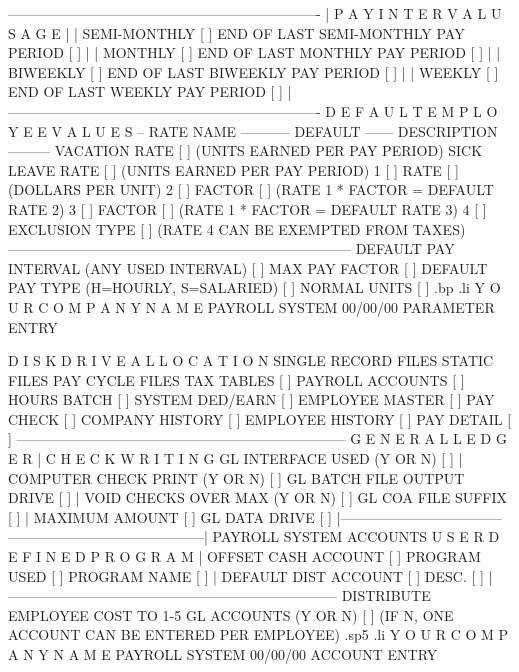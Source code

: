      -------------------------------------------------------------------
     |		     P A Y   I N T E R V A L   U S A G E	       |
     | SEMI-MONTHLY [ ] END OF LAST SEMI-MONTHLY PAY PERIOD [	     ] |
     | MONTHLY	    [ ] END OF LAST MONTHLY PAY PERIOD	    [	     ] |
     | BIWEEKLY     [ ] END OF LAST BIWEEKLY PAY PERIOD     [	     ] |
     | WEEKLY	    [ ] END OF LAST WEEKLY PAY PERIOD	    [	     ] |
     -------------------------------------------------------------------
	      D E F A U L T   E M P L O Y E E	V A L U E S
   -- RATE NAME  -----------  DEFAULT  ------  DESCRIPTION  ---------
    VACATION	     RATE   [	      ] (UNITS EARNED PER PAY PERIOD)
    SICK LEAVE	     RATE   [	      ] (UNITS EARNED PER PAY PERIOD)
 1 [		   ] RATE   [	      ] (DOLLARS PER UNIT)
 2 [		   ] FACTOR [	      ] (RATE 1 * FACTOR = DEFAULT RATE 2)
 3 [		   ] FACTOR [	      ] (RATE 1 * FACTOR = DEFAULT RATE 3)
 4 [		   ] EXCLUSION TYPE [ ] (RATE 4 CAN BE EXEMPTED FROM TAXES)
 --------------------------------------------------------------------------
  DEFAULT PAY INTERVAL (ANY USED INTERVAL) [ ]	MAX PAY FACTOR [	 ]
  DEFAULT PAY TYPE (H=HOURLY, S=SALARIED)  [ ]	NORMAL UNITS   [	 ]
.bp
.li
		    Y O U R   C O M P A N Y   N A M E
			    PAYROLL SYSTEM
  00/00/00		    PARAMETER ENTRY

		   D I S K   D R I V E	 A L L O C A T I O N
    SINGLE RECORD FILES 	  STATIC  FILES 	   PAY CYCLE FILES
    TAX TABLES	    [ ]        PAYROLL ACCOUNTS [ ]	   HOURS BATCH	[ ]
    SYSTEM DED/EARN [ ]        EMPLOYEE MASTER	[ ]	   PAY CHECK	[ ]
    COMPANY HISTORY [ ]        EMPLOYEE HISTORY [ ]	   PAY DETAIL	[ ]
    -----------------------------------------------------------------------
      G E N E R A L   L E D G E R      |      C H E C K   W R I T I N G
    GL INTERFACE USED (Y OR N) [ ]     |  COMPUTER CHECK PRINT (Y OR N) [ ]
    GL BATCH FILE OUTPUT DRIVE [ ]     |  VOID CHECKS OVER MAX (Y OR N) [ ]
    GL COA FILE SUFFIX	      [  ]     |  MAXIMUM AMOUNT     [		  ]
    GL DATA DRIVE	       [ ]     |-----------------------------------
    ------------------------------------------|    PAYROLL SYSTEM ACCOUNTS
     U S E R   D E F I N E D   P R O G R A M  |  OFFSET CASH  ACCOUNT [   ]
    PROGRAM USED [ ]  PROGRAM NAME [	    ] |  DEFAULT DIST ACCOUNT [   ]
    DESC.    [				    ] |
    -----------------------------------------------------------------------
	  DISTRIBUTE EMPLOYEE COST TO  1-5 GL ACCOUNTS (Y OR N) [ ]
	       (IF N, ONE ACCOUNT CAN BE ENTERED PER EMPLOYEE)
.sp5
.li
		Y O U R   C O M P A N Y   N A M E
			 PAYROLL SYSTEM
  00/00/00		  ACCOUNT ENTRY

